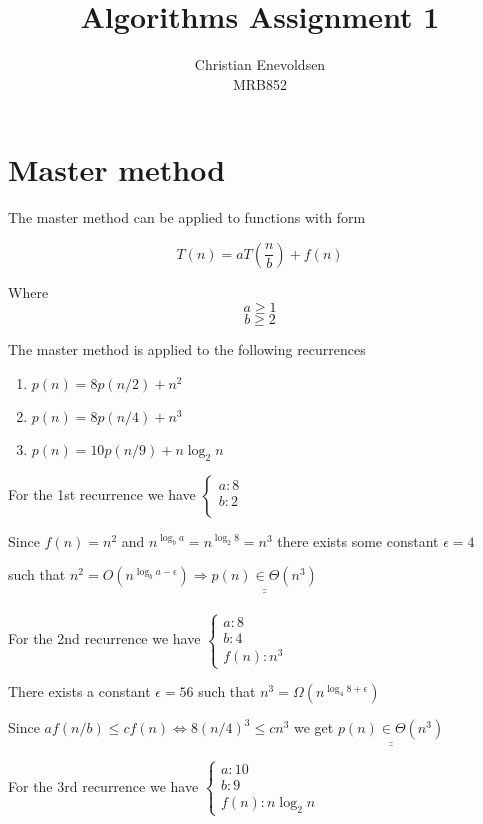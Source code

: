 \documentclass[12pt]{article}
\title{Algorithms Assignment 1}
\author{Christian Enevoldsen\\MRB852\\}
\begin{document}
\maketitle

\newpage
\section{Master method}

The master method can be applied to functions with form

\[T(n) = aT(\frac{n}{b}) + f(n)\]

Where 
\[a \ge 1\]
\[b \ge 2 \]

The master method is applied to the following recurrences

\begin{enumerate}
\item $p(n) = 8p(n / 2) + n^2$
\item $p(n) = 8p(n / 4) + n^3$
\item $p(n) = 10p(n / 9) + n \log _2 n$
\end{enumerate}

For the 1st recurrence we have $\begin{cases}
	a: 8 \\
	b: 2 \\
\end{cases} $

Since $f(n) = n^2$ and $n^{\log _b a} = n^{\log _2 8} = n^3$ 
there exists some constant $\epsilon = 4$ 

such that   $ n^2 = O(n^{\log _b a - \epsilon}) \Rightarrow \underline{\underline{ p(n) \in \Theta(n^3)}}$\\\\

For the 2nd recurrence we have $\begin{cases}
	a: 8 \\
	b: 4 \\
	f(n): n^3
\end{cases} $

There exists a constant $\epsilon = 56$ such that $n^3 = \Omega (n^{\log _4 8 + \epsilon})$

Since $af(n/b) \leq cf(n) \Leftrightarrow 8(n/4)^3 \leq cn^3$ we get $\underline{\underline{p(n) \in \Theta(n^3)}}$


For the 3rd recurrence we have $\begin{cases}
	a: 10 \\
	b: 9 \\
	f(n): n\log _2 n 
\end{cases} $
\end{document}
